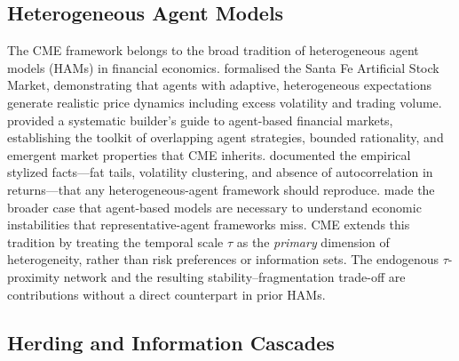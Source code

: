 \documentclass[10pt,twocolumn]{article}
\begin{document}
\subsection{Heterogeneous Agent Models}

The CME framework belongs to the broad tradition of heterogeneous agent
models (HAMs) in financial economics.  \cite{arthur1997} formalised the
Santa Fe Artificial Stock Market, demonstrating that agents with adaptive,
heterogeneous expectations generate realistic price dynamics including
excess volatility and trading volume.  \cite{lebaron2001} provided a
systematic builder's guide to agent-based financial markets, establishing
the toolkit of overlapping agent strategies, bounded rationality, and
emergent market properties that CME inherits.  \cite{cont2001} documented
the empirical stylized facts---fat tails, volatility clustering, and
absence of autocorrelation in returns---that any heterogeneous-agent
framework should reproduce.  \cite{farmerfoley2009} made the broader case
that agent-based models are necessary to understand economic
instabilities that representative-agent frameworks miss.  CME extends this
tradition by treating the temporal scale $\tau$ as the \emph{primary}
dimension of heterogeneity, rather than risk preferences or information
sets.  The endogenous $\tau$-proximity network and the resulting
stability--fragmentation trade-off are contributions without a direct
counterpart in prior HAMs.

\subsection{Herding and Information Cascades}
\end{document}
